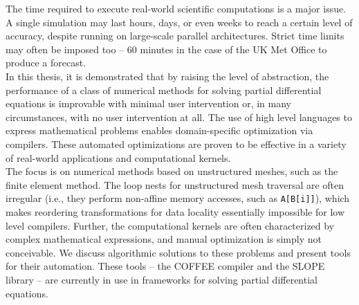 The time required to execute real-world scientific computations is a major issue. A single simulation may last hours, days, or even weeks to reach a certain level of accuracy, despite running on large-scale parallel architectures. Strict time limits may often be imposed too -- 60 minutes in the case of the UK Met Office to produce a forecast. \\

In this thesis, it is demonstrated that by raising the level of abstraction, the performance of a class of numerical methods for solving partial differential equations is improvable with minimal user intervention or, in many circumstances, with no user intervention at all. The use of high level languages to express mathematical problems enables domain-specific optimization via compilers. These automated optimizations are proven to be effective in a variety of real-world applications and computational kernels. \\

The focus is on numerical methods based on unstructured meshes, such as the finite element method. The loop nests for unstructured mesh traversal are often irregular (i.e., they perform non-affine memory accesses, such as {\tt A[B[i]]}), which makes reordering transformations for data locality essentially impossible for low level compilers. Further, the computational kernels are often characterized by complex mathematical expressions, and manual optimization is simply not conceivable. We discuss algorithmic solutions to these problems and present tools for their automation. These tools -- the COFFEE compiler and the SLOPE library -- are currently in use in frameworks for solving partial differential equations.